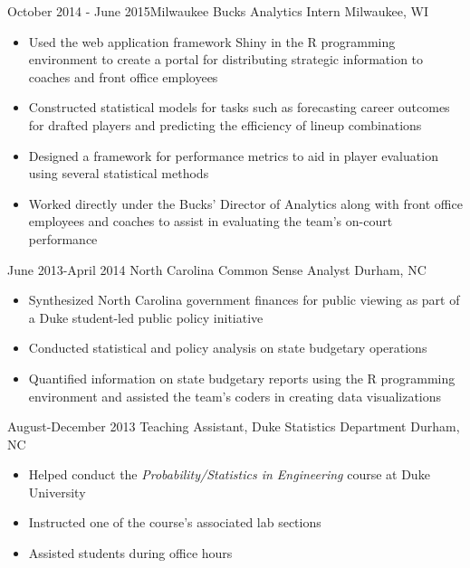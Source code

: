 \documentclass[10pt,a4paper,sans]{moderncv}        %
\begin{document}
\cventry
  {October 2014 - June 2015}{Milwaukee Bucks Analytics Intern}
  {}
  {Milwaukee, WI}
  {}
  {
    \begin{itemize}
      \item{Used the web application framework Shiny in the R programming environment to create a portal for distributing strategic information to coaches and front office employees}
      \item{Constructed statistical models for tasks such as forecasting career outcomes for drafted players and predicting the 
      efficiency of lineup combinations}
      \item{Designed a framework for performance metrics to aid in player evaluation using several statistical methods}
      \item{Worked directly under the Bucks' Director of Analytics along with front office employees and coaches to assist in evaluating 
      the team's on-court performance}
    \end{itemize}
  }

\cventry
  {June 2013-April 2014}
  {North Carolina Common Sense Analyst}
  {}
  {Durham, NC}
  {}
  {
    \begin{itemize}
      \item{Synthesized North Carolina government finances for public viewing as part of a Duke student-led public policy initiative}
      \item{Conducted statistical and policy analysis on state budgetary operations}
      \item{Quantified information on state budgetary reports using the R programming environment and assisted the team's coders in creating 
      data visualizations}
    \end{itemize}
  }
    
\cventry
  {August-December 2013}
  {Teaching Assistant, Duke Statistics Department}
  {}
  {Durham, NC}
  {}
  {
    \begin{itemize}
      \item{Helped conduct the \emph{Probability/Statistics in Engineering} course at Duke University}
      \item{Instructed one of the course's associated lab sections} 
      \item{Assisted students during office hours}
    \end{itemize}
  }

\clearpage
\end{document}
